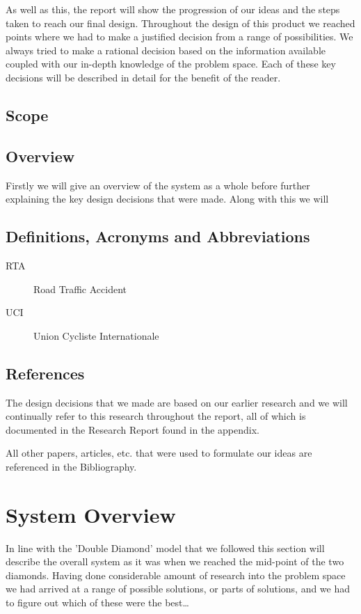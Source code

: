 \documentclass[]{report}
\begin{document}
As well as this, the report will show the progression of our ideas and the steps taken to reach our final design. Throughout the design of this product we reached points where we had to make a justified decision from a range of possibilities. We always tried to make a rational decision based on the information available coupled with our in-depth knowledge of the problem space. Each of these key decisions will be described in detail for the benefit of the reader.
\section{Scope}

\section{Overview}
Firstly we will give an overview of the system as a whole before further explaining the key design decisions that were made. Along with this we will 
\section{Definitions, Acronyms and Abbreviations}
\begin{description}
\item[RTA] Road Traffic Accident
\item[UCI] Union Cycliste Internationale
\end{description}
\section{References}
The design decisions that we made are based on our earlier research and we will continually refer to this research throughout the report, all of which is documented in the Research Report found in the appendix. 

All other papers, articles, etc. that were used to formulate our ideas are referenced in the Bibliography.

\chapter{System Overview}
In line with the 'Double Diamond' model that we followed this section will describe the overall system as it was when we reached the mid-point of the two diamonds. Having done considerable amount of research into the problem space we had arrived at a range of possible solutions, or parts of solutions, and we had to figure out which of these were the best\ldots
\end{document}
